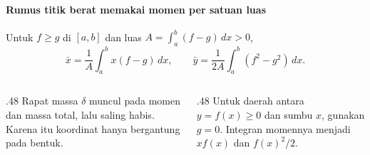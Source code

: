 \documentclass{../../kalkulus-ppt}
\begin{document}
\begin{frame}{\insertsection}
    \framesubtitle{Rumus titik berat memakai momen per satuan luas}
    \begin{teorema}
        Untuk $f\ge g$ di $[a,b]$ dan luas $A=\int_a^b(f-g)\,dx>0$,
        \[
            \bar x=\frac{1}{A}\int_a^b x(f-g)\,dx,\qquad
            \bar y=\frac{1}{2A}\int_a^b(f^2-g^2)\,dx.
        \]
    \end{teorema}
    \begin{columns}[t,onlytextwidth]
        \begin{column}{.48\textwidth}
            Rapat massa $\delta$ muncul pada momen dan massa total,
            lalu saling habis. Karena itu koordinat hanya bergantung pada bentuk.
        \end{column}
        \begin{column}{.48\textwidth}
            Untuk daerah antara $y=f(x)\ge0$ dan sumbu $x$, gunakan $g=0$.
            Integran momennya menjadi $xf(x)$ dan $f(x)^2/2$.
        \end{column}
    \end{columns}
\end{frame}
\end{document}
